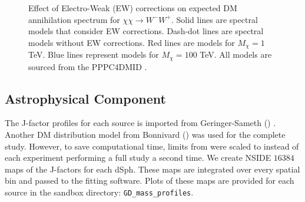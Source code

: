 \begin{figure}[ht]
\caption{Effect of Electro-Weak (EW) corrections on expected DM annihilation spectrum for $\chi\chi \rightarrow W^-W^+$. Solid lines are spectral models that consider EW corrections. Dash-dot lines are spectral models without EW corrections. Red lines are models for $M_\chi = 1$ TeV. Blue lines represent models for $M_\chi = 100$ TeV. All models are sourced from the PPPC4DMID \cite{Cirelli_2011}.}
\label{fig:ew_vs_noew}
\end{figure}

\subsection{\J Astrophysical Component}\label{sec:gd_spatialmodel}

The J-factor profiles for each source is imported from Geringer-Sameth (\GS) \cite{Geringer_Sameth_2015}.
Another DM distribution model from Bonnivard (\B) \cite{Bonnivard:2014kza} was used for the complete study.
However, to save computational time, limits from \GS were scaled to \B instead of each experiment performing a full study a second time.
We create NSIDE $16384$ maps of the J-factors for each dSph.
These maps are integrated over every spatial bin and passed to the fitting software.
Plots of these maps are provided for each source in the sandbox directory: \texttt{GD\_mass\_profiles}.

